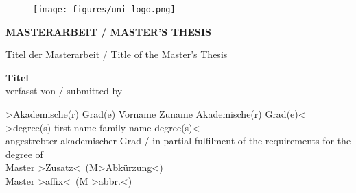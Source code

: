 ﻿

%
\begin{titlepage}

\begin{center}
\begin{figure}
\hspace{9.1cm}
\texttt{[image: figures/uni\_logo.png]}
\end{figure}
\vspace*{2.1cm}

\fontsize{22}{0} \selectfont \textbf{ MASTERARBEIT / MASTER'S THESIS}\\
\vspace*{2.5cm}

\fontsize{11}{0} \selectfont Titel der Masterarbeit / Title of the Master's Thesis\\
\vspace*{0.4cm}

\fontsize{18}{0} \selectfont \textbf{\glqq Titel\grqq}\\

\vspace*{2.8cm}
{\fontsize{11}{0} \selectfont verfasst von / submitted by}\\
\vspace*{0.4cm}

{ \fontsize{14}{0} \selectfont \textgreater Akademische(r) Grad(e) Vorname Zuname Akademische(r) Grad(e)\textless\\
\textgreater degree(s) first name family name degree(s)\textless}\\
\vspace*{1.6cm}
{ \fontsize{11}{0} \selectfont angestrebter akademischer Grad / in partial fulfilment of the requirements for the degree of}\\
\vspace*{0.4cm}
{ \fontsize{14}{0} \selectfont  Master \textgreater Zusatz\textless \ (M\textgreater Abk\"urzung\textless)\\
Master \textgreater affix\textless \ (M \textgreater abbr.\textless)}\\
\vspace*{2.4cm}


\end{center}
\end{titlepage}
